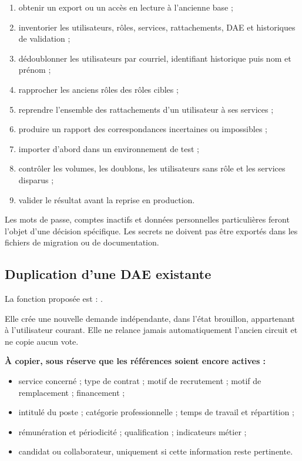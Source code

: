 \begin{enumerate}
  \item obtenir un export ou un accès en lecture à l'ancienne base ;
  \item inventorier les utilisateurs, rôles, services, rattachements, DAE et historiques de validation ;
  \item dédoublonner les utilisateurs par courriel, identifiant historique puis nom et prénom ;
  \item rapprocher les anciens rôles des rôles cibles ;
  \item reprendre l'ensemble des rattachements d'un utilisateur à ses services ;
  \item produire un rapport des correspondances incertaines ou impossibles ;
  \item importer d'abord dans un environnement de test ;
  \item contrôler les volumes, les doublons, les utilisateurs sans rôle et les services disparus ;
  \item valider le résultat avant la reprise en production.
\end{enumerate}

Les mots de passe, comptes inactifs et données personnelles particulières feront l'objet d'une décision spécifique. Les secrets ne doivent pas être exportés dans les fichiers de migration ou de documentation.

\subsection{Duplication d'une DAE existante}

La fonction proposée est : .

Elle crée une nouvelle demande indépendante, dans l'état brouillon, appartenant à l'utilisateur courant. Elle ne relance jamais automatiquement l'ancien circuit et ne copie aucun vote.

\textbf{À copier, sous réserve que les références soient encore actives :}

\begin{itemize}
  \item service concerné ; type de contrat ; motif de recrutement ; motif de remplacement ; financement ;
  \item intitulé du poste ; catégorie professionnelle ; temps de travail et répartition ;
  \item rémunération et périodicité ; qualification ; indicateurs métier ;
  \item candidat ou collaborateur, uniquement si cette information reste pertinente.
\end{itemize}

